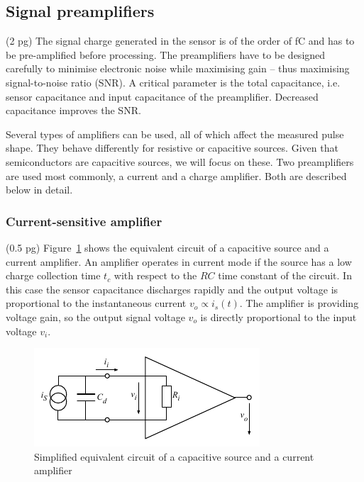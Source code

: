 \documentclass[12pt]{mytustyle}  %
\begin{document}
\subsection{Signal preamplifiers}
(2 pg)
The signal charge generated in the sensor is of the order of fC and has to be pre-amplified before processing. The preamplifiers have to be designed carefully to minimise electronic noise while maximising gain -- thus maximising signal-to-noise ratio (SNR). A critical parameter is the total capacitance, i.e. sensor capacitance and input capacitance of the preamplifier. Decreased capacitance improves the SNR. 

Several types of amplifiers can be used, all of which affect the measured pulse shape. They behave differently for resistive or capacitive sources. Given that semiconductors are capacitive sources, we will focus on these. Two preamplifiers are used most commonly, a current and a charge amplifier. Both are described below in detail. 


\subsubsection{Current-sensitive amplifier}
(0.5 pg)
Figure~\ref{fig:curramp} shows the equivalent circuit of a capacitive source and a current amplifier. An amplifier operates in current mode if the source has a low charge collection time $t_c$ with respect to the $RC$ time constant of the circuit. In this case the sensor capacitance discharges rapidly and the output voltage is proportional to the instantaneous current $v_o \propto i_s(t)$. The amplifier is providing voltage gain, so the output signal voltage $v_o$ is directly proportional to the input voltage $v_i$.

\begin{figure}[!t]
\begin{center}
\includegraphics[width=0.6\linewidth]{plots/curramp}
\caption{Simplified equivalent circuit of a capacitive source and a current amplifier}
\label{fig:curramp}
\end{center}
\end{figure}
\end{document}
